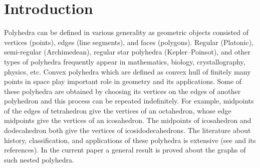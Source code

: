 \documentclass{birkjour}
\theoremstyle{definition}
\theoremstyle{remark}
\numberwithin{equation}{section}
\begin{document}
\maketitle
\section{Introduction} Polyhedra can be defined in various generality as geometric objects consisted of vertices (points), edges (line segments), and faces (polygons). Regular (Platonic), semi-regular (Archimedean), regular star polyhedra (Kepler–Poinsot), and other types of polyhedra frequently appear in mathematics, biology, crystallography, physics, etc. Convex polyhedra which are defined as convex hull of finitely many points in space play important role in geometry and its applications. Some of these polyhedra are obtained by choosing its vertices on the edges of another polyhedron and this process can be repeated indefinitely. For example, midpoints of the edges of tetrahedron give the vertices of an octahedron, whose edge midpoints give the vertices of an icosahedron. The midpoints of icosahedron and dodecahedron both give the vertices of icosidodecahedrons. The literature about history, classification, and applications of these polyhedra is extensive (see \cite{crom} and its references). In the current paper a general result is proved about the graphs of such nested polyhedra.
\end{document}
